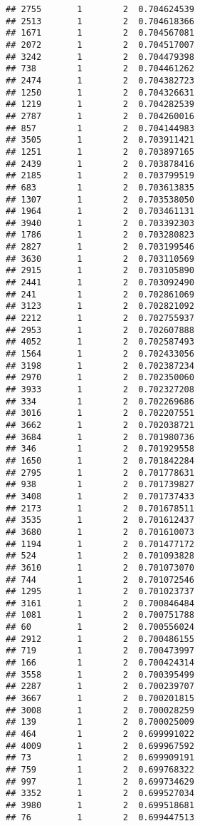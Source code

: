 \documentclass[
]{article}
\begin{document}
\begin{verbatim}
## 2755       1        2  0.704624539
## 2513       1        2  0.704618366
## 1671       1        2  0.704567081
## 2072       1        2  0.704517007
## 3242       1        2  0.704479398
## 738        1        2  0.704461262
## 2474       1        2  0.704382723
## 1250       1        2  0.704326631
## 1219       1        2  0.704282539
## 2787       1        2  0.704260016
## 857        1        2  0.704144983
## 3505       1        2  0.703911421
## 1251       1        2  0.703897165
## 2439       1        2  0.703878416
## 2185       1        2  0.703799519
## 683        1        2  0.703613835
## 1307       1        2  0.703538050
## 1964       1        2  0.703461131
## 3940       1        2  0.703392303
## 1786       1        2  0.703280823
## 2827       1        2  0.703199546
## 3630       1        2  0.703110569
## 2915       1        2  0.703105890
## 2441       1        2  0.703092490
## 241        1        2  0.702861069
## 3123       1        2  0.702821092
## 2212       1        2  0.702755937
## 2953       1        2  0.702607888
## 4052       1        2  0.702587493
## 1564       1        2  0.702433056
## 3198       1        2  0.702387234
## 2970       1        2  0.702350060
## 3933       1        2  0.702327208
## 334        1        2  0.702269686
## 3016       1        2  0.702207551
## 3662       1        2  0.702038721
## 3684       1        2  0.701980736
## 346        1        2  0.701929558
## 1650       1        2  0.701842284
## 2795       1        2  0.701778631
## 938        1        2  0.701739827
## 3408       1        2  0.701737433
## 2173       1        2  0.701678511
## 3535       1        2  0.701612437
## 3680       1        2  0.701610073
## 1194       1        2  0.701477172
## 524        1        2  0.701093828
## 3610       1        2  0.701073070
## 744        1        2  0.701072546
## 1295       1        2  0.701023737
## 3161       1        2  0.700846484
## 1081       1        2  0.700751788
## 60         1        2  0.700556024
## 2912       1        2  0.700486155
## 719        1        2  0.700473997
## 166        1        2  0.700424314
## 3558       1        2  0.700395499
## 2287       1        2  0.700239707
## 3667       1        2  0.700201815
## 3008       1        2  0.700028259
## 139        1        2  0.700025009
## 464        1        2  0.699991022
## 4009       1        2  0.699967592
## 73         1        2  0.699909191
## 759        1        2  0.699768322
## 997        1        2  0.699734629
## 3352       1        2  0.699527034
## 3980       1        2  0.699518681
## 76         1        2  0.699447513

\end{verbatim}
\end{document}
